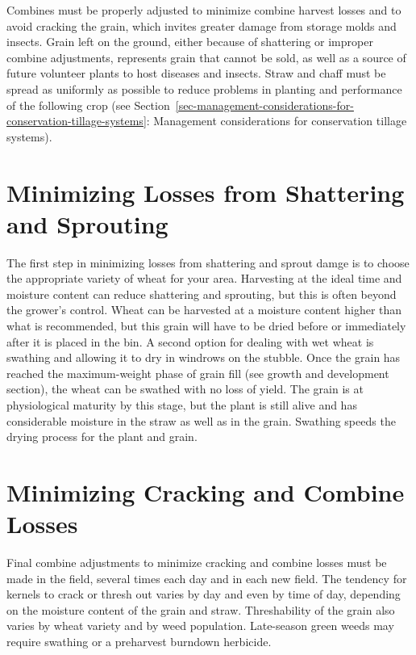 \documentclass[
  letterpaper,
  DIV=11,
  numbers=noendperiod]{scrreprt}
\begin{document}
Combines must be properly adjusted to minimize combine harvest losses
and to avoid cracking the grain, which invites greater damage from
storage molds and insects. Grain left on the ground, either because of
shattering or improper combine adjustments, represents grain that cannot
be sold, as well as a source of future volunteer plants to host diseases
and insects. Straw and chaff must be spread as uniformly as possible to
reduce problems in planting and performance of the following crop (see
Section~\ref{sec-management-considerations-for-conservation-tillage-systems}:
Management considerations for conservation tillage systems).

\section{Minimizing Losses from Shattering and
Sprouting}\label{minimizing-losses-from-shattering-and-sprouting}

The first step in minimizing losses from shattering and sprout damge is
to choose the appropriate variety of wheat for your area. Harvesting at
the ideal time and moisture content can reduce shattering and sprouting,
but this is often beyond the grower's control. Wheat can be harvested at
a moisture content higher than what is recommended, but this grain will
have to be dried before or immediately after it is placed in the bin. A
second option for dealing with wet wheat is swathing and allowing it to
dry in windrows on the stubble. Once the grain has reached the
maximum-weight phase of grain fill (see growth and development section),
the wheat can be swathed with no loss of yield. The grain is at
physiological maturity by this stage, but the plant is still alive and
has considerable moisture in the straw as well as in the grain. Swathing
speeds the drying process for the plant and grain.

\section{Minimizing Cracking and Combine
Losses}\label{minimizing-cracking-and-combine-losses}

Final combine adjustments to minimize cracking and combine losses must
be made in the field, several times each day and in each new field. The
tendency for kernels to crack or thresh out varies by day and even by
time of day, depending on the moisture content of the grain and straw.
Threshability of the grain also varies by wheat variety and by weed
population. Late-season green weeds may require swathing or a preharvest
burndown herbicide.
\end{document}
